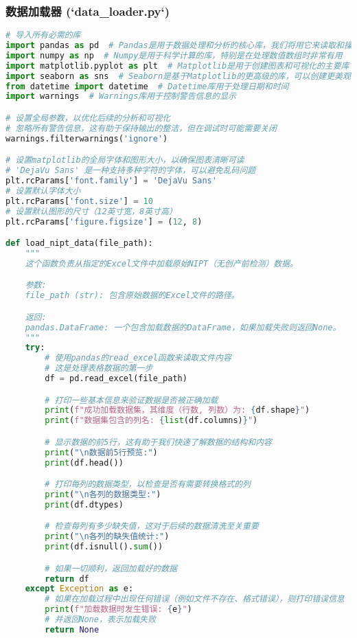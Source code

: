 \documentclass[UTF8, a4paper, 11pt]{ctexart}
\begin{document}
\subsubsection{数据加载器 (`data_loader.py`)}
\begin{lstlisting}[language=Python, caption={数据加载与预处理脚本。}]
# 导入所有必需的库
import pandas as pd  # Pandas是用于数据处理和分析的核心库，我们将用它来读取和操作数据
import numpy as np  # Numpy是用于科学计算的库，特别是在处理数值数组时非常有用
import matplotlib.pyplot as plt  # Matplotlib是用于创建图表和可视化的主要库
import seaborn as sns  # Seaborn是基于Matplotlib的更高级的库，可以创建更美观的统计图表
from datetime import datetime  # Datetime库用于处理日期和时间
import warnings  # Warnings库用于控制警告信息的显示

# 设置全局参数，以优化后续的分析和可视化
# 忽略所有警告信息，这有助于保持输出的整洁，但在调试时可能需要关闭
warnings.filterwarnings('ignore')

# 设置matplotlib的全局字体和图形大小，以确保图表清晰可读
# 'DejaVu Sans' 是一种支持多种字符的字体，可以避免乱码问题
plt.rcParams['font.family'] = 'DejaVu Sans'
# 设置默认字体大小
plt.rcParams['font.size'] = 10
# 设置默认图形的尺寸（12英寸宽，8英寸高）
plt.rcParams['figure.figsize'] = (12, 8)

def load_nipt_data(file_path):
    """
    这个函数负责从指定的Excel文件中加载原始NIPT（无创产前检测）数据。

    参数:
    file_path (str): 包含原始数据的Excel文件的路径。

    返回:
    pandas.DataFrame: 一个包含加载数据的DataFrame，如果加载失败则返回None。
    """
    try:
        # 使用pandas的read_excel函数来读取文件内容
        # 这是处理表格数据的第一步
        df = pd.read_excel(file_path)

        # 打印一些基本信息来验证数据是否被正确加载
        print(f"成功加载数据集，其维度（行数, 列数）为: {df.shape}")
        print(f"数据集包含的列名: {list(df.columns)}")

        # 显示数据的前5行，这有助于我们快速了解数据的结构和内容
        print("\n数据前5行预览:")
        print(df.head())

        # 打印每列的数据类型，以检查是否有需要转换格式的列
        print("\n各列的数据类型:")
        print(df.dtypes)

        # 检查每列有多少缺失值，这对于后续的数据清洗至关重要
        print("\n各列的缺失值统计:")
        print(df.isnull().sum())

        # 如果一切顺利，返回加载好的数据
        return df
    except Exception as e:
        # 如果在加载过程中出现任何错误（例如文件不存在、格式错误），则打印错误信息
        print(f"加载数据时发生错误: {e}")
        # 并返回None，表示加载失败
        return None


\end{lstlisting}
\end{document}
